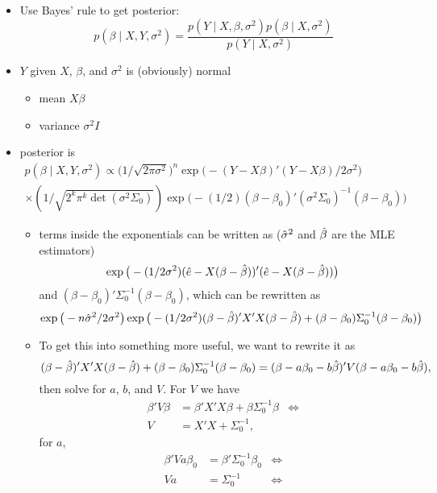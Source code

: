 \begin{itemize}
\item Use Bayes' rule to get posterior:
  \[ p(\beta \mid X, Y, \sigma^{2}) = \frac{p(Y \mid X, \beta, \sigma^{2}) p(\beta \mid X,
    \sigma^{2})}{p(Y \mid X, \sigma^{2})}\]
\item $Y$ given $X$, $\beta$, and $\sigma^{2}$ is (obviously) normal
\begin{itemize}
\item mean $X\beta$
\item variance $\sigma^2 I$
\end{itemize}
\item posterior is
  \begin{multline}
    p(\beta \mid X, Y, \sigma^2) \propto \big(1/\sqrt{2 \pi \sigma^2}\big)^n
    \exp\big(-(Y - X\beta)'(Y - X\beta)/2\sigma^2\big) \\
    \times (1/\sqrt{2^k \pi^k \det(\sigma^2 \Sigma_0)})
    \exp\big(- (1/2) (\beta - \beta_0)'(\sigma^2 \Sigma_0)^{-1} (\beta - \beta_0)\big)
  \end{multline}
\begin{itemize}
\item terms inside the exponentials can be written as ($\hat{\sigma}^2$ and
  $\hat{\beta}$ are the MLE estimators)
  \[\exp\big(- (1/2 \sigma^2) (\hat{e} - X(\beta - \hat{\beta}))' (\hat{e} - X(\beta - \hat{\beta}))\big)\]
  and $(\beta - \beta_0)'\Sigma_0^{-1}(\beta - \beta_0)$,
  which can be rewritten as
  \begin{equation*}
    \exp\big(- n \hat{\sigma}^2/2 \sigma^2\big)
    \exp\big(- (1/2\sigma^2) (\beta - \hat{\beta})'X'X(\beta - \hat{\beta}) + (\beta - \beta_0)\Sigma_0^{-1}(\beta - \beta_0)\big)
  \end{equation*}
\item To get this into something more useful, we want to rewrite it as
  \[(\beta - \hat{\beta})'X'X(\beta - \hat{\beta}) + (\beta - \beta_0)\Sigma_0^{-1}(\beta - \beta_0) = (\beta - a \beta_0 - b \hat{\beta})'V(\beta - a \beta_0 - b \hat{\beta}),\]
  then solve for $a$, $b$, and $V$.  For $V$ we have
  \begin{align*}
    \beta'V\beta &= \beta'X'X\beta + \beta \Sigma_0^{-1} \beta & \iff \\
    V    &= X'X + \Sigma_0^{-1},
  \end{align*}
  for $a$,
  \begin{align*}
    \beta'V a \beta_0 &= \beta'\Sigma_0^{-1}\beta_0 & \iff \\
    V a      &= \Sigma_0^{-1}     & \iff \\

\end{align*}
\end{itemize}
\end{itemize}
